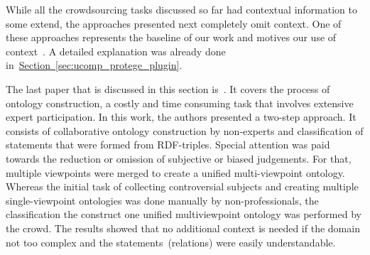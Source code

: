 While all the crowdsourcing tasks discussed so far had contextual information to some extend, the approaches presented next completely omit context. 
One of these approaches represents the baseline of our work and motives our use of context~\cite{wohlgenannt2016}. A detailed explanation was already done in~\hyperref[sec:ucomp_protege_plugin]{Section~\ref*{sec:ucomp_protege_plugin}}.

The last paper that is discussed in this section is~\cite{zhitomirsky2017}. It covers the process of ontology construction, a costly and time consuming task that involves extensive expert participation. In this work, the authors presented a two-step approach. It consists of collaborative ontology construction by non-experts and classification of statements that were formed from RDF-triples. Special attention was paid towards the reduction or omission of subjective or biased judgements. For that, multiple viewpoints were merged to create a unified multi-viewpoint ontology.
Whereas the initial task of collecting controversial subjects and creating multiple single-viewpoint ontologies was done manually by non-professionals, the classification the construct one unified multiviewpoint ontology was performed by the crowd. 
The results showed that no additional context is needed if the domain not too complex and the statements~(relations) were easily understandable.  


